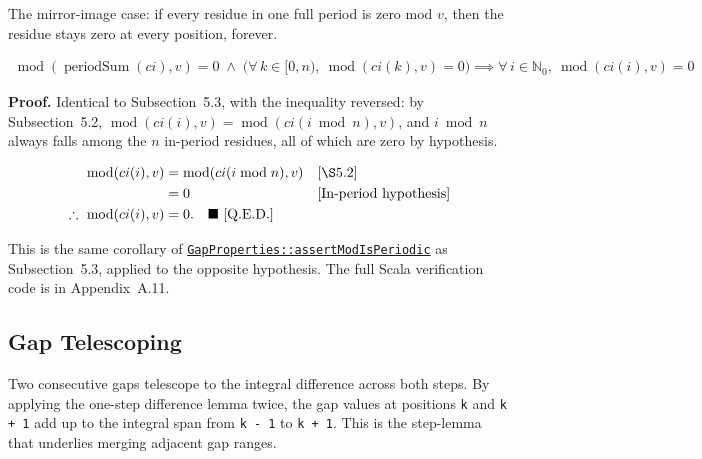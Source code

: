 The mirror-image case: if every residue in one full period is zero mod $v$,
then the residue stays zero at every position, forever.

\begin{equation*}
\begin{aligned}
\operatorname{mod}(\operatorname{periodSum}(ci), v) = 0 \;\land\; \big(\forall\, k \in [0, n),\ \operatorname{mod}(ci(k), v) = 0\big)
\implies \forall\, i \in \mathbb{N}_0,\ \operatorname{mod}(ci(i), v) = 0
\end{aligned}
\end{equation*}

{\sloppypar
\textbf{Proof.} Identical to Subsection~5.3, with the inequality reversed:
by Subsection~5.2, $\operatorname{mod}(ci(i), v) =
\operatorname{mod}(ci(i \bmod n), v)$, and $i \bmod n$ always falls among
the $n$ in-period residues, all of which are zero by hypothesis.
\par}

\begin{equation*}
\begin{aligned}
\operatorname{mod}(ci(i),v) &= \operatorname{mod}(ci(i \bmod n),v) &&\text{[\S5.2]} \\
                      &= 0 &&\text{[In-period hypothesis]} \\
\therefore\ \operatorname{mod}(ci(i),v) &= 0.
  \quad \blacksquare\ \text{[Q.E.D.]}
\end{aligned}
\end{equation*}

{\raggedright
This is the same corollary of
\href{https://github.com/thiagomata/prime-numbers/blob/integral-cycle-article-v1.0.0/src/main/scala/v1/chapter4/cycle/integral/recursive/properties/GapProperties.scala}{\texttt{GapProperties::\allowbreak assertModIsPeriodic}}
as Subsection~5.3, applied to the opposite hypothesis. The full Scala
verification code is in Appendix~A.11.
\par}

\subsection{Gap Telescoping}

Two consecutive gaps telescope to the integral difference across both steps.
By applying the one-step difference lemma twice, the gap values at positions
\texttt{k} and \texttt{k + 1} add up to the integral span from \texttt{k - 1}
to \texttt{k + 1}. This is the step-lemma that underlies merging adjacent gap
ranges.

